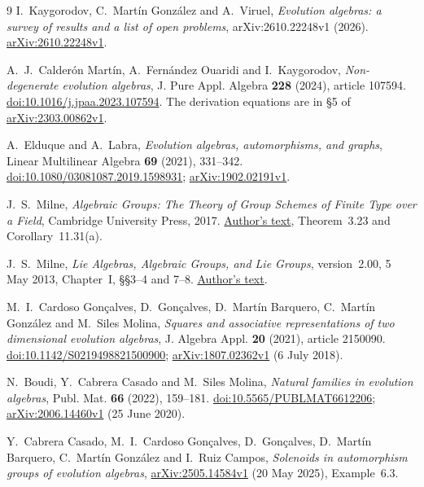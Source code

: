 \documentclass[11pt]{article}
\begin{document}
\begin{thebibliography}{9}
I.~Kaygorodov, C.~Mart\'in Gonz\'alez and A.~Viruel,
\emph{Evolution algebras: a survey of results and a list of open problems},
arXiv:2610.22248v1 (2026).
\href{https://arxiv.org/abs/2610.22248v1}{arXiv:2610.22248v1}.

A.~J.~Calder\'on Mart\'in, A.~Fern\'andez Ouaridi and I.~Kaygorodov,
\emph{Non-degenerate evolution algebras},
J. Pure Appl. Algebra \textbf{228} (2024), article 107594.
\href{https://doi.org/10.1016/j.jpaa.2023.107594}{doi:10.1016/j.jpaa.2023.107594}.
The derivation equations are in \S5 of
\href{https://arxiv.org/abs/2303.00862v1}{arXiv:2303.00862v1}.

A.~Elduque and A.~Labra,
\emph{Evolution algebras, automorphisms, and graphs},
Linear Multilinear Algebra \textbf{69} (2021), 331--342.
\href{https://doi.org/10.1080/03081087.2019.1598931}{doi:10.1080/03081087.2019.1598931};
\href{https://arxiv.org/abs/1902.02191v1}{arXiv:1902.02191v1}.

J.~S.~Milne, \emph{Algebraic Groups: The Theory of Group Schemes of Finite
Type over a Field}, Cambridge University Press, 2017.
\href{https://www.jmilne.org/math/Books/iAG2017.pdf}{Author's text},
Theorem~3.23 and Corollary~11.31(a).

J.~S.~Milne, \emph{Lie Algebras, Algebraic Groups, and Lie Groups},
version~2.00, 5 May 2013, Chapter~I, \S\S3--4 and 7--8.
\href{https://www.jmilne.org/math/CourseNotes/LAG.pdf}{Author's text}.

M.~I.~Cardoso Gon\c calves, D.~Gon\c calves, D.~Mart\'in Barquero,
C.~Mart\'in Gonz\'alez and M.~Siles Molina,
\emph{Squares and associative representations of two dimensional evolution algebras},
J. Algebra Appl. \textbf{20} (2021), article 2150090.
\href{https://doi.org/10.1142/S0219498821500900}{doi:10.1142/S0219498821500900};
\href{https://arxiv.org/abs/1807.02362v1}{arXiv:1807.02362v1} (6 July 2018).

N.~Boudi, Y.~Cabrera Casado and M.~Siles Molina,
\emph{Natural families in evolution algebras},
Publ. Mat. \textbf{66} (2022), 159--181.
\href{https://doi.org/10.5565/PUBLMAT6612206}{doi:10.5565/PUBLMAT6612206};
\href{https://arxiv.org/abs/2006.14460v1}{arXiv:2006.14460v1} (25 June 2020).

Y.~Cabrera Casado, M.~I.~Cardoso Gon\c calves, D.~Gon\c calves,
D.~Mart\'in Barquero, C.~Mart\'in Gonz\'alez and I.~Ruiz Campos,
\emph{Solenoids in automorphism groups of evolution algebras},
\href{https://arxiv.org/abs/2505.14584v1}{arXiv:2505.14584v1} (20 May 2025),
Example~6.3.
\end{thebibliography}
\end{document}

